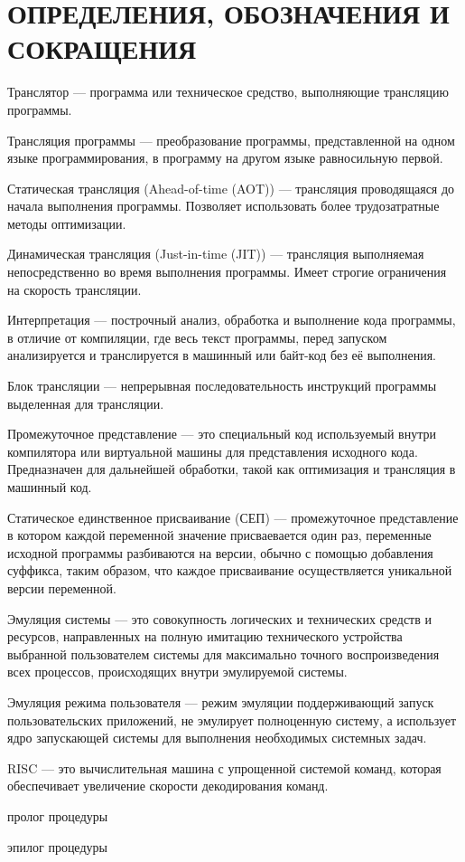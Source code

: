 \section*{ОПРЕДЕЛЕНИЯ, ОБОЗНАЧЕНИЯ И СОКРАЩЕНИЯ}

Транслятор --- программа или техническое средство, выполняющие трансляцию программы. \cite{translate}

Трансляция программы --- преобразование программы, представленной на одном языке программирования, в программу на другом языке равносильную первой. \cite{translate}

Статическая трансляция (Ahead-of-time (AOT)) --- трансляция проводящаяся до начала выполнения программы. Позволяет использовать более трудозатратные методы оптимизации.

Динамическая трансляция (Just-in-time (JIT)) --- трансляция выполняемая непосредственно во время выполнения программы. Имеет строгие ограничения на скорость трансляции.

Интерпретация --- построчный анализ, обработка и выполнение кода программы, в отличие от компиляции, где весь текст программы, перед запуском анализируется и транслируется в машинный или байт-код без её выполнения. \cite{interpret}

Блок трансляции --- непрерывная последовательность инструкций программы выделенная для трансляции.

Промежуточное представление ---  это специальный код используемый внутри компилятора или виртуальной машины для представления исходного кода. Предназначен для дальнейшей обработки, такой как оптимизация и трансляция в машинный код.

Статическое единственное присваивание (СЕП) --- промежуточное представление в котором каждой переменной значение присваевается один раз, переменные исходной программы разбиваются на версии, обычно с помощью добавления суффикса, таким образом, что каждое присваивание осуществляется уникальной версии переменной.

Эмуляция системы --- это совокупность логических и технических средств и ресурсов, направленных на полную имитацию технического устройства выбранной пользователем системы для максимально точного воспроизведения всех процессов, происходящих внутри эмулируемой системы. 

Эмуляция режима пользователя --- режим эмуляции поддерживающий запуск пользовательских приложений, не эмулирует полноценную систему, а использует ядро запускающей системы для выполнения необходимых системных задач.

RISC --- это вычислительная машина с упрощенной системой команд, которая обеспечивает увеличение скорости декодирования команд. \cite{it_dict}

пролог процедуры

эпилог процедуры

\pagebreak